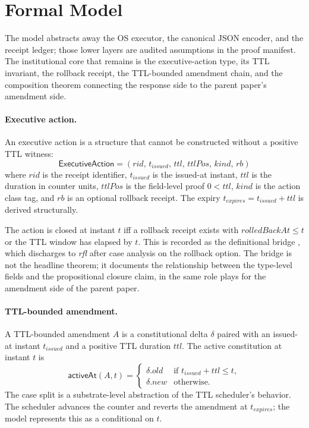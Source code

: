 \section{Formal Model}
\label{sec:model-ra}

The model abstracts away the OS executor, the canonical JSON encoder,
and the receipt ledger; those lower layers are audited assumptions in
the proof manifest. The institutional core that remains is the
executive-action type, its TTL invariant, the rollback receipt, the
TTL-bounded amendment chain, and the composition theorem connecting
the response side to the parent paper's amendment side.

\paragraph{Executive action.}
An executive action is a structure that cannot be constructed without
a positive TTL witness:
\[
  \mathsf{ExecutiveAction} =
  (\mathit{rid},\,\mathit{t_{\text{issued}}},\,\mathit{ttl},\,
   \mathit{ttlPos},\,\mathit{kind},\,\mathit{rb})
\]
where $\mathit{rid}$ is the receipt identifier, $\mathit{t_{\text{issued}}}$
is the issued-at instant, $\mathit{ttl}$ is the duration in counter
units, $\mathit{ttlPos}$ is the field-level proof $0 < \mathit{ttl}$,
$\mathit{kind}$ is the action class tag, and $\mathit{rb}$ is an
optional rollback receipt. The expiry $\mathit{t_{\text{expires}}} =
\mathit{t_{\text{issued}}} + \mathit{ttl}$ is derived structurally.

The action is closed at instant $t$ iff a rollback receipt exists with
$\mathit{rolledBackAt} \le t$ or the TTL window has elapsed by $t$.
This is recorded as the definitional bridge
, which discharges to
\emph{rfl} after case analysis on the rollback option. The bridge is
not the headline theorem; it documents the relationship between the
type-level fields and the propositional closure claim, in the same
role  plays for the
amendment side of the parent paper.

\paragraph{TTL-bounded amendment.}
A TTL-bounded amendment $A$ is a constitutional delta $\delta$ paired
with an issued-at instant $\mathit{t_{\text{issued}}}$ and a positive
TTL duration $\mathit{ttl}$. The active constitution at instant $t$ is
\[
  \mathsf{activeAt}(A, t) =
  \begin{cases}
    \delta.\mathit{old} & \text{if } \mathit{t_{\text{issued}}} + \mathit{ttl} \le t, \\
    \delta.\mathit{new} & \text{otherwise.}
  \end{cases}
\]
The case split is a substrate-level abstraction of the TTL scheduler's
behavior. The scheduler advances the counter and reverts the amendment
at $\mathit{t_{\text{expires}}}$; the model represents this as a
conditional on $t$.

